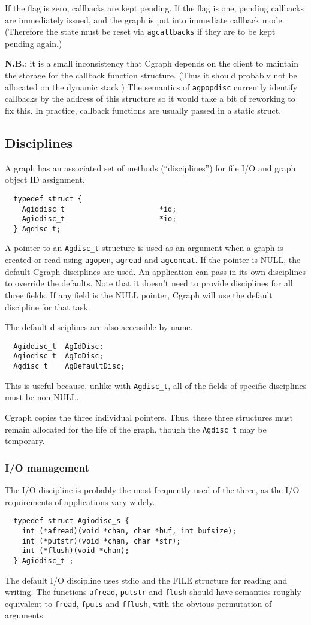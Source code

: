 \documentclass[11pt,letterpaper]{article}
\begin{document}
If the flag is zero, callbacks are kept pending. 
If the flag is one, pending callbacks are immediately issued,
and the graph is put into immediate callback mode.
(Therefore the state must be reset via \verb"agcallbacks"
if they are to be kept pending again.)

{\bf N.B.}: it is a small inconsistency that Cgraph depends on the client
to maintain the storage for the callback function structure.
(Thus it should probably not be allocated on the dynamic stack.)
The semantics of \verb"agpopdisc" currently identify callbacks by
the address of this structure so it would take a bit of reworking
to fix this.  In practice, callback functions are usually passed
in a static struct.

\subsection{Disciplines}
\label{subsec:disciplines}
A graph has an associated set of methods (``disciplines'')
for file I/O and graph object ID assignment.
\begin{verbatim}
  typedef struct {   
    Agiddisc_t                      *id;
    Agiodisc_t                      *io;
  } Agdisc_t;
\end{verbatim}
A pointer to an \verb"Agdisc_t" structure is used as an argument when
a graph is created or read using \verb"agopen",
\verb"agread" and \verb"agconcat". If the pointer is NULL, the default
Cgraph disciplines are used. An application can pass in its own disciplines
to override the defaults. Note that it doesn't need to provide disciplines for
all three fields. If any field is the NULL pointer, Cgraph will use the default
discipline for that task.

The default disciplines are also accessible by name.
\begin{verbatim}
  Agiddisc_t  AgIdDisc;
  Agiodisc_t  AgIoDisc;
  Agdisc_t    AgDefaultDisc;
\end{verbatim}
This is useful because, unlike with \verb"Agdisc_t", all of the fields of
specific disciplines must be non-NULL.

Cgraph copies the three individual pointers. Thus, these three structures must remain
allocated for the life of the graph, though the \verb"Agdisc_t" may be temporary.

\subsubsection{I/O management}
The I/O discipline is probably the most frequently used of the three, as the I/O requirements of
applications vary widely. 
\begin{verbatim}
  typedef struct Agiodisc_s {
    int (*afread)(void *chan, char *buf, int bufsize);
    int (*putstr)(void *chan, char *str);
    int (*flush)(void *chan);
  } Agiodisc_t ;
\end{verbatim}
The default I/O discipline uses stdio and the FILE structure for reading and writing. The functions
\verb"afread", \verb"putstr" and \verb"flush" should have semantics roughly equivalent to 
\verb"fread", \verb"fputs" and \verb"fflush", with the obvious permutation of arguments.
\end{document}

